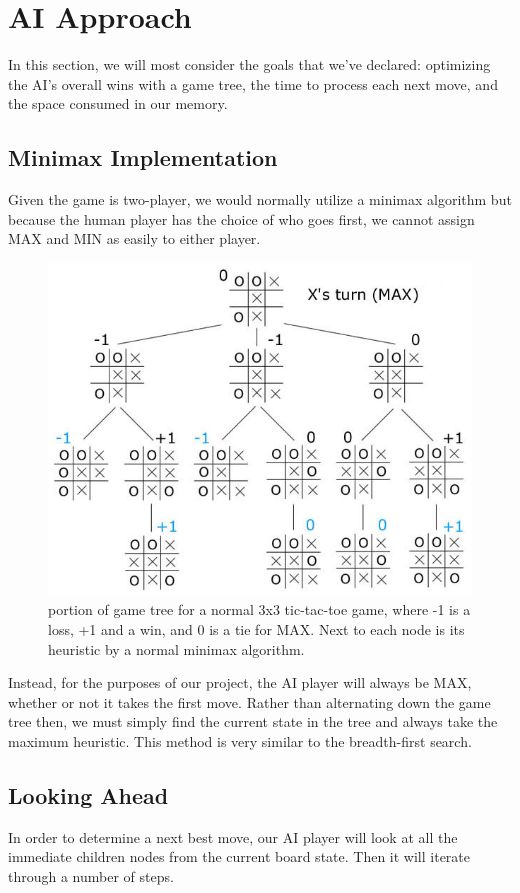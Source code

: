 \documentclass[preprint,12pt]{elsarticle}
\begin{document}
\section{AI Approach}
	In this section, we will most consider the goals that we've declared: optimizing the AI's overall wins with a game tree, the time to process each next move, and the space consumed in our memory.

	\subsection{Minimax Implementation}
		Given the game is two-player, we would normally utilize a minimax algorithm but because the human player has the choice of who goes first, we cannot assign MAX and MIN as easily to either player.

		\begin{figure}[h]
			\centering\includegraphics[width=0.75\linewidth]{4.jpg}
			\caption{portion of game tree for a normal 3x3 tic-tac-toe game, where -1 is a loss, +1 and a win, and 0 is a tie for MAX. Next to each node is its heuristic by a normal minimax algorithm.}
		\end{figure}

		Instead, for the purposes of our project, the AI player will always be MAX, whether or not it takes the first move. Rather than alternating down the game tree then, we must simply find the current state in the tree and always take the maximum heuristic. This method is very similar to the breadth-first search.

	\subsection{Looking Ahead}
		In order to determine a next best move, our AI player will look at all the immediate children nodes from the current board state. Then it will iterate through a number of steps.
\end{document}
